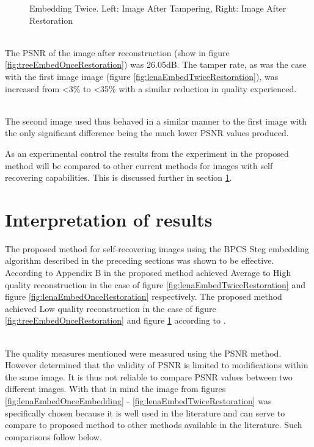 \documentclass[12pt]{article}
\begin{document}
\begin{figure}[h]
{}%
\caption{Embedding Twice. Left: Image After Tampering, Right: Image After Restoration}
\label{fig:treeEmbedTwiceRestoration}
\end{figure}

\hspace{0pt} \\
The PSNR of the image after reconstruction (show in figure \ref{fig:treeEmbedOnceRestoration}) was 26.05dB.
The tamper rate, as was the case with the first image image (figure \ref{fig:lenaEmbedTwiceRestoration}), was increased from \textless 3\% to \textless 35\% with a similar reduction in quality experienced.

\hspace{0pt} \\
The second image used thus behaved in a similar manner to the first image with the only significant difference being the much lower PSNR values produced.

As an experimental control the results from the experiment in the proposed method will be compared to other current methods for images with self recovering capabilities.
This is discussed further in  section \ref{interpretation}.

\section{Interpretation of results}
\label{interpretation}
The proposed method for self-recovering images using the BPCS Steg embedding algorithm described in the preceding sections was shown to be effective.
According to Appendix B in \cite{korus2013efficient} the proposed method achieved Average to High quality reconstruction in the case of figure \ref{fig:lenaEmbedTwiceRestoration} and figure \ref{fig:lenaEmbedOnceRestoration} respectively.
The proposed method achieved Low quality reconstruction in the case of figure \ref{fig:treeEmbedOnceRestoration} and figure \ref{fig:treeEmbedTwiceRestoration} according to \cite{korus2013efficient}.

\hspace{0pt} \\
The quality measures mentioned were measured using the PSNR method. \cite{huynh2008scope} However determined that the validity of PSNR is limited to modifications within the same image.
It is thus not reliable to compare PSNR values between two different images.
With that in mind the image from figures \ref{fig:lenaEmbedOnceEmbedding} - \ref{fig:lenaEmbedTwiceRestoration} was specifically chosen because it is well used in the literature and can serve to compare to proposed method to other methods available in the literature.
Such comparisons follow below. 
\end{document}
